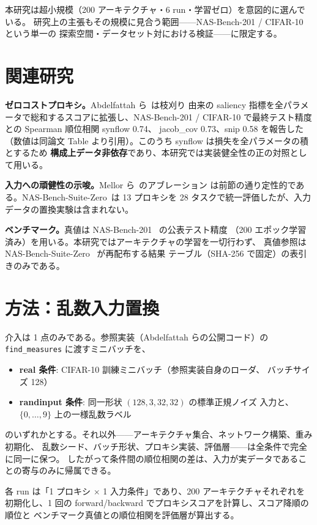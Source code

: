 \documentclass[11pt]{article}
\providecommand{\unverified}[1]{#1}
\begin{document}
本研究は超小規模（200 アーキテクチャ・6 run・学習ゼロ）を意図的に選んでいる。
研究上の主張もその規模に見合う範囲——NAS-Bench-201 / CIFAR-10 という単一の
探索空間・データセット対における検証——に限定する。

\section{関連研究}
\textbf{ゼロコストプロキシ。}Abdelfattah ら~\cite{abdelfattah-2021-zero}は枝刈り
由来の saliency 指標を全パラメータで総和するスコアに拡張し、NAS-Bench-201 /
CIFAR-10 で最終テスト精度との Spearman 順位相関 synflow \unverified{0.74}、
jacob\_cov \unverified{0.73}、snip \unverified{0.58} を報告した（数値は同論文
Table より引用）。このうち synflow は損失を全パラメータの積とするため
\textbf{構成上データ非依存}であり、本研究では実装健全性の正の対照として用いる。

\textbf{入力への頑健性の示唆。}Mellor ら~\cite{mellor-2021-neural}のアブレーション
は前節の通り定性的である。NAS-Bench-Suite-Zero~\cite{krishnakumar-2022-nas}は
13 プロキシを 28 タスクで統一評価したが、入力データの置換実験は含まれない。

\textbf{ベンチマーク。}真値は NAS-Bench-201~\cite{dong-2020-nas} の公表テスト精度
（200 エポック学習済み）を用いる。本研究ではアーキテクチャの学習を一切行わず、
真値参照は NAS-Bench-Suite-Zero~\cite{krishnakumar-2022-nas} が再配布する結果
テーブル（SHA-256 で固定）の表引きのみである。

\section{方法：乱数入力置換}
介入は 1 点のみである。参照実装（Abdelfattah らの公開コード）の
\texttt{find\_measures} に渡すミニバッチを、
\begin{itemize}
  \item \textbf{real 条件}: CIFAR-10 訓練ミニバッチ（参照実装自身のローダ、
        バッチサイズ 128）
  \item \textbf{randinput 条件}: 同一形状 $(128, 3, 32, 32)$ の標準正規ノイズ
        入力と、$\{0,\dots,9\}$ 上の一様乱数ラベル
\end{itemize}
のいずれかとする。それ以外——アーキテクチャ集合、ネットワーク構築、重み初期化、
乱数シード、バッチ形状、プロキシ実装、評価層——は全条件で完全に同一に保つ。
したがって条件間の順位相関の差は、入力が実データであることの寄与のみに帰属できる。

各 run は「1 プロキシ $\times$ 1 入力条件」であり、200 アーキテクチャそれぞれを
初期化し、1 回の forward/backward でプロキシスコアを計算し、スコア降順の順位と
ベンチマーク真値との順位相関を評価層が算出する。
\end{document}
